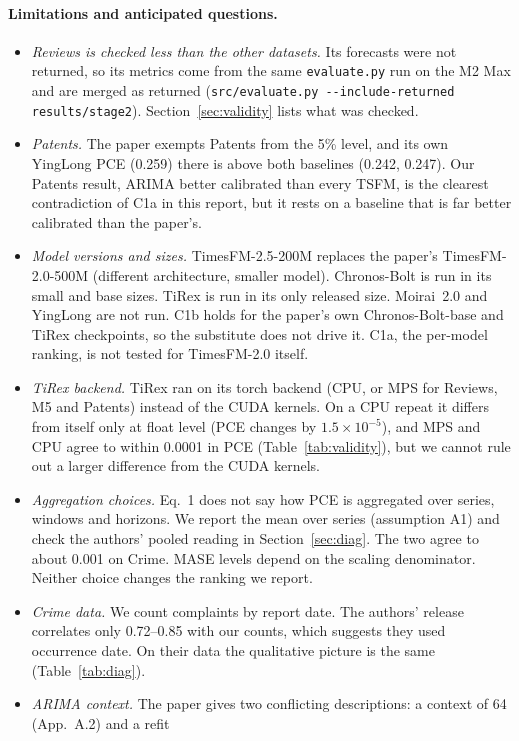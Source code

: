 \paragraph{Limitations and anticipated questions.}\label{sec:limits}
\begin{itemize}
\item \emph{Reviews is checked less than the other datasets.} Its forecasts were not returned, so its metrics come
from the same \texttt{evaluate.py} run on the M2 Max and are merged as returned
(\texttt{src/evaluate.py -{}-include-returned results/stage2}). Section~\ref{sec:validity} lists what was checked.
\item \emph{Patents.} The paper exempts Patents from the 5\% level, and its own YingLong PCE (0.259) there is above
both baselines (0.242, 0.247). Our Patents result, ARIMA better calibrated than every TSFM, is the clearest
contradiction of C1a in this report, but it rests on a baseline that is far better calibrated than the paper's.
\item \emph{Model versions and sizes.} TimesFM-2.5-200M replaces the paper's TimesFM-2.0-500M (different
architecture, smaller model). Chronos-Bolt is run in its small and base sizes. TiRex is run in its only released
size. Moirai~2.0 and YingLong are not run. C1b holds for the paper's own Chronos-Bolt-base and TiRex checkpoints,
so the substitute does not drive it. C1a, the per-model ranking, is not tested for TimesFM-2.0 itself.
\item \emph{TiRex backend.} TiRex ran on its torch backend (CPU, or MPS for Reviews, M5 and Patents) instead of the
CUDA kernels. On a CPU repeat it differs from itself only at float level (PCE changes by $1.5\times10^{-5}$), and
MPS and CPU agree to within 0.0001 in PCE (Table~\ref{tab:validity}), but we cannot rule out a larger
difference from the CUDA kernels.
\item \emph{Aggregation choices.} Eq.~1 does not say how PCE is aggregated over series, windows and horizons. We
report the mean over series (assumption A1) and check the authors' pooled reading in Section~\ref{sec:diag}. The
two agree to about 0.001 on Crime. MASE levels depend on the scaling denominator. Neither choice changes the
ranking we report.
\item \emph{Crime data.} We count complaints by report date. The authors' release correlates only 0.72--0.85 with
our counts, which suggests they used occurrence date. On their data the qualitative picture is the same
(Table~\ref{tab:diag}).
\item \emph{ARIMA context.} The paper gives two conflicting descriptions: a context of 64 (App.~A.2) and a refit

\end{itemize}

